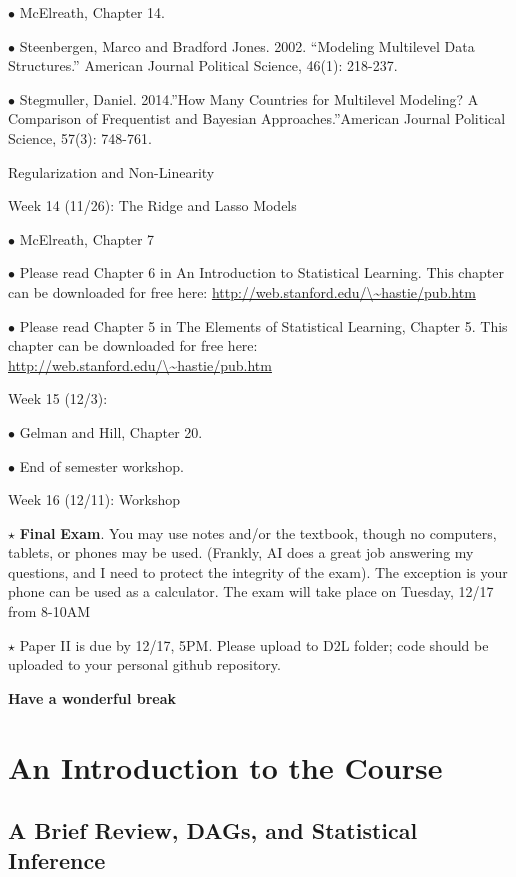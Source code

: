 \documentclass[
]{book}
\begin{document}
\(\bullet\) McElreath, Chapter 14.

\(\bullet\) Steenbergen, Marco and Bradford Jones. 2002. ``Modeling Multilevel Data Structures.'' American Journal Political Science, 46(1): 218-237.

\(\bullet\) Stegmuller, Daniel. 2014.''How Many Countries for Multilevel Modeling? A Comparison of Frequentist and Bayesian Approaches.''American Journal Political Science, 57(3): 748-761.

Regularization and Non-Linearity

Week 14 (11/26): The Ridge and Lasso Models

\(\bullet\) McElreath, Chapter 7

\(\bullet\) Please read Chapter 6 in An Introduction to Statistical Learning. This chapter can be downloaded for free here: \href{http://web.stanford.edu/~hastie/pub.htm}{http://web.stanford.edu/\textbackslash\textasciitilde hastie/pub.htm}

\(\bullet\) Please read Chapter 5 in The Elements of Statistical Learning, Chapter 5. This chapter can be downloaded for free here: \href{http://web.stanford.edu/~hastie/pub.htm}{http://web.stanford.edu/\textbackslash\textasciitilde hastie/pub.htm}

Week 15 (12/3):

\(\bullet\) Gelman and Hill, Chapter 20.

\(\bullet\) End of semester workshop.

Week 16 (12/11): Workshop

\(\star\) \textbf{Final} \textbf{Exam}. You may use notes and/or the textbook, though no computers, tablets, or phones may be used. (Frankly, AI does a great job answering my questions, and I need to protect the integrity of the exam). The exception is your phone can be used as a calculator. The exam will take place on Tuesday, 12/17 from 8-10AM

\(\star\) Paper II is due by 12/17, 5PM. Please upload to D2L folder; code should be uploaded to your personal github repository.

\textbf{Have a wonderful break}

\chapter{An Introduction to the Course}\label{an-introduction-to-the-course}

\section{A Brief Review, DAGs, and Statistical Inference}\label{a-brief-review-dags-and-statistical-inference}
\end{document}
